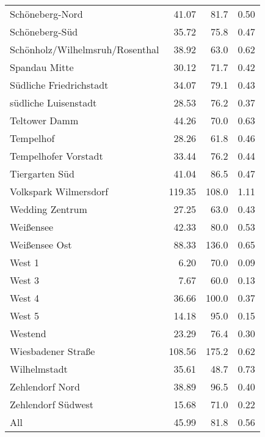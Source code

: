 \begin{tabular}{lrrr}
Schöneberg-Nord & 41.07 & 81.7 & 0.50\\
Schöneberg-Süd & 35.72 & 75.8 & 0.47\\
Schönholz/Wilhelmsruh/Rosenthal & 38.92 & 63.0 & 0.62\\
Spandau Mitte & 30.12 & 71.7 & 0.42\\
Südliche Friedrichstadt & 34.07 & 79.1 & 0.43\\
südliche Luisenstadt & 28.53 & 76.2 & 0.37\\
Teltower Damm & 44.26 & 70.0 & 0.63\\
Tempelhof & 28.26 & 61.8 & 0.46\\
Tempelhofer Vorstadt & 33.44 & 76.2 & 0.44\\
Tiergarten Süd & 41.04 & 86.5 & 0.47\\
Volkspark Wilmersdorf & 119.35 & 108.0 & 1.11\\
Wedding Zentrum & 27.25 & 63.0 & 0.43\\
Weißensee & 42.33 & 80.0 & 0.53\\
Weißensee Ost & 88.33 & 136.0 & 0.65\\
West 1 & 6.20 & 70.0 & 0.09\\
West 3 & 7.67 & 60.0 & 0.13\\
West 4 & 36.66 & 100.0 & 0.37\\
West 5 & 14.18 & 95.0 & 0.15\\
Westend & 23.29 & 76.4 & 0.30\\
Wiesbadener Straße & 108.56 & 175.2 & 0.62\\
Wilhelmstadt & 35.61 & 48.7 & 0.73\\
Zehlendorf  Nord & 38.89 & 96.5 & 0.40\\
Zehlendorf  Südwest & 15.68 & 71.0 & 0.22\\
All & 45.99 & 81.8 & 0.56\\
\bottomrule
\end{tabular}